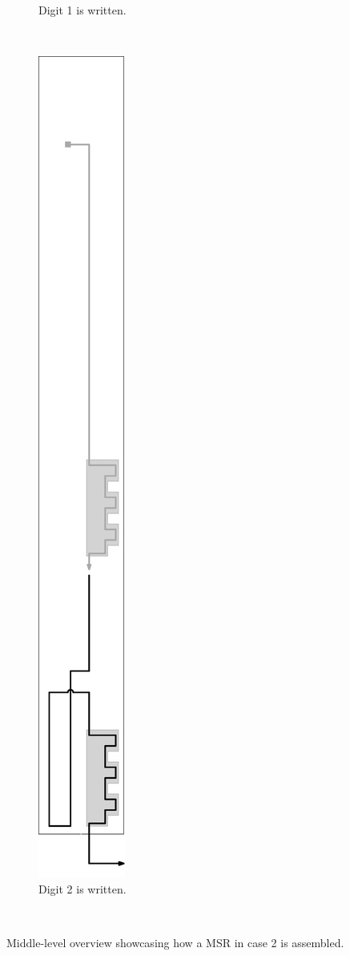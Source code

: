 \documentclass[10pt]{article}
\begin{document}
\begin{figure}
\begin{subfigure}[t]{0.3\textwidth}
        \caption{\label{fig:mid_level_2digit_msr_phase_2} Digit 1 is written. }
    \end{subfigure}%
   ~
    \begin{subfigure}[t]{0.3\textwidth}
        \centering
        \includegraphics[width=.5in,valign=t]{mid_level_2digit_msr_phase_3}
        \caption{\label{fig:mid_level_2digit_msr_phase_3} Digit 2 is written. }
    \end{subfigure}%
    ~

    \caption{\label{fig:mid_level_2digit_msr_overview} Middle-level overview showcasing how a MSR in case 2 is assembled. }

\end{figure}
\end{document}
